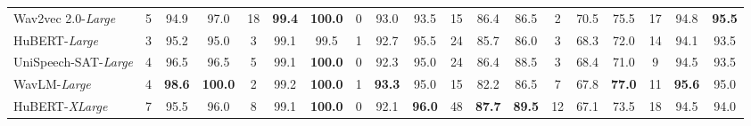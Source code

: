 \documentclass[cameraready]{Interspeech}
\newcommand{\best}[1]{\textbf{#1}}
\begin{document}
\begin{table}[t]
{\begin{tabular}{@{}l *{6}{c c c}@{}}
\midrule
Wav2vec 2.0-\textit{Large}          & 5  & 94.9 & 97.0 & 18 & \best{99.4} & \best{100.0} & 0  & 93.0 & 93.5        & 15 & 86.4 & 86.5        & 2  & 70.5 & 75.5        & 17 & 94.8 & \best{95.5} \\
HuBERT-\textit{Large}               & 3  & 95.2 & 95.0 & 3  & 99.1 & 99.5       & 1  & 92.7 & 95.5        & 24 & 85.7 & 86.0        & 3  & 68.3 & 72.0        & 14 & 94.1 & 93.5 \\
UniSpeech-SAT-\textit{Large}        & 4  & 96.5 & 96.5 & 5  & 99.1 & \best{100.0} & 0  & 92.3 & 95.0        & 24 & 86.4 & 88.5        & 3  & 68.4 & 71.0        & 9  & 94.5 & 93.5 \\
WavLM-\textit{Large}                & 4  & \best{98.6} & \best{100.0} & 2  & 99.2 & \best{100.0} & 1  & \best{93.3} & 95.0        & 15 & 82.2 & 86.5        & 7  & 67.8 & \best{77.0} & 11 & \best{95.6} & 95.0 \\
\midrule
HuBERT-\textit{XLarge}              & 7  & 95.5 & 96.0 & 8  & 99.1 & \best{100.0} & 0  & 92.1 & \best{96.0} & 48 & \best{87.7} & \best{89.5} & 12 & 67.1 & 73.5        & 18 & 94.5 & 94.0 \\
\bottomrule
\end{tabular}
}
\vspace{-1.85em}
\label{tab:peak_results}
\end{table}
\end{document}
